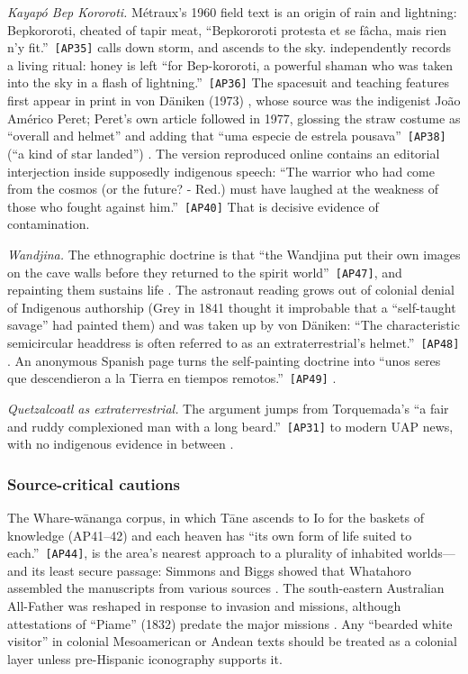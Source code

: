 \documentclass[11pt,a4paper]{article}
\newcommand{\pid}[1]{\texttt{\small #1}}
\begin{document}
\emph{Kayapó Bep Kororoti.} Métraux's 1960 field text is an origin of rain and lightning: Bepkororoti, cheated of tapir meat, \enquote{Bepkororoti protesta et se fâcha, mais rien n'y fit.}~\pid{[AP35]} calls down storm, and ascends to the sky. \textcite{posey1983keeping} independently records a living ritual: honey is left \enquote{for Bep-kororoti, a powerful shaman who was taken into the sky in a flash of lightning.}~\pid{[AP36]} The spacesuit and teaching features first appear in print in von Däniken (1973) \parencite{vondaniken1973welt}, whose source was the indigenist João Américo Peret; Peret's own article followed in 1977, glossing the straw costume as ``overall and helmet'' and adding that \enquote{uma especie de estrela pousava}~\pid{[AP38]} (``a kind of star landed'') \parencite{peret1977bep}. The version reproduced online contains an editorial interjection inside supposedly indigenous speech: \enquote{The warrior who had come from the cosmos (or the future? - Red.) must have laughed at the weakness of those who fought against him.}~\pid{[AP40]} That is decisive evidence of contamination.

\emph{Wandjina.} The ethnographic doctrine is that \enquote{the Wandjina put their own images on the cave walls before they returned to the spirit world}~\pid{[AP47]}, and repainting them sustains life \parencite{frederick2009wandjina,crawford1968art}. The astronaut reading grows out of colonial denial of Indigenous authorship (Grey in 1841 thought it improbable that a ``self-taught savage'' had painted them) and was taken up by von Däniken: \enquote{The characteristic semicircular headdress is often referred to as an extraterrestrial’s helmet.}~\pid{[AP48]} \parencite{grey1841journals,frederick2009wandjina}. An anonymous Spanish page turns the self-painting doctrine into \enquote{unos seres que descendieron a la Tierra en tiempos remotos.}~\pid{[AP49]} \parencite{anon_wandjinas}.

\emph{Quetzalcoatl as extraterrestrial.} The argument jumps from Torquemada's \enquote{a fair and ruddy complexioned man with a long beard.}~\pid{[AP31]} to modern UAP news, with no indigenous evidence in between \parencite{walia2018quetzalcoatl}.

\subsubsection{Source-critical cautions}

The Whare-wānanga corpus, in which Tāne ascends to Io for the baskets of knowledge (AP41--42) and each heaven has \enquote{its own form of life suited to each.}~\pid{[AP44]}, is the area's nearest approach to a plurality of inhabited worlds---and its least secure passage: Simmons and Biggs showed that Whatahoro assembled the manuscripts from various sources \parencite{smith1913lore,simmons1970sources}. The south-eastern Australian All-Father was reshaped in response to invasion and missions, although attestations of ``Piame'' (1832) predate the major missions \parencite{swain1993place,henderson1832observations}. Any ``bearded white visitor'' in colonial Mesoamerican or Andean texts should be treated as a colonial layer unless pre-Hispanic iconography supports it.
\end{document}
